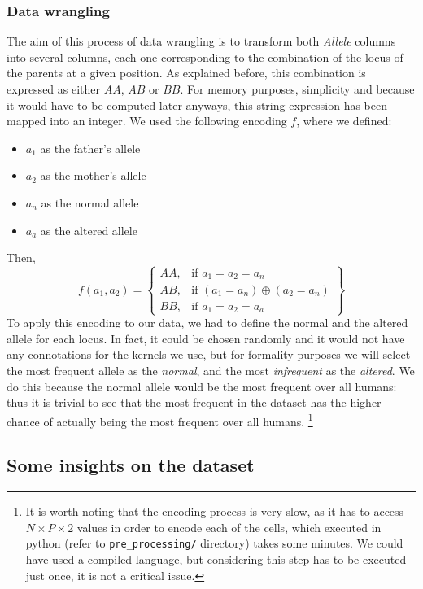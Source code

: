 \documentclass[a4paper, 11pt]{article}
\theoremstyle{definition}
\theoremstyle{remark}
\begin{document}
\subsubsection*{Data wrangling}
The aim of this process of data wrangling is to transform both \textit{Allele} columns into several columns, each one corresponding to the combination of the locus of the parents at a given position.
As explained before, this combination is expressed as either $AA$, $AB$ or $BB$. For memory purposes, simplicity and because it would have to be computed later anyways, this string expression has been mapped into an integer. We used the following encoding $f$, where we defined:
\begin{itemize}
    \item $a_1$ as the father's allele
    \item $a_2$ as the mother's allele
    \item $a_n$ as the normal allele
    \item $a_a$ as the altered allele
\end{itemize}
Then,
\[
    f(a_1,a_2) = \left\{\begin{array}{ll}
        AA, & \text{if  } a_1=a_2=a_n\\
        AB, & \text{if  } (a_1=a_n) \oplus (a_2=a_n)\\
        BB, & \text{if  } a_1=a_2=a_a
        \end{array}\right\}
\]
\newline
To apply this encoding to our data, we had to define the normal and the altered allele for each locus. In fact, it could be chosen randomly and it would not have any connotations for the kernels we use, but for formality purposes we will select the most frequent allele as the \textit{normal}, and the most \textit{infrequent} as the \textit{altered}. We do this because the normal allele would be the most frequent over all humans: thus it is trivial to see that the most frequent in the dataset has the higher chance of actually being the most frequent over all humans. \footnote{It is worth noting that the encoding process is very slow, as it has to access $N\times P\times 2$ values in order to encode each of the cells, which executed in python (refer to \texttt{pre\_processing/} directory) takes some minutes. We could have used a compiled language, but considering this step has to be executed just once, it is not a critical issue.}

\subsection{Some insights on the dataset}
\end{document}

